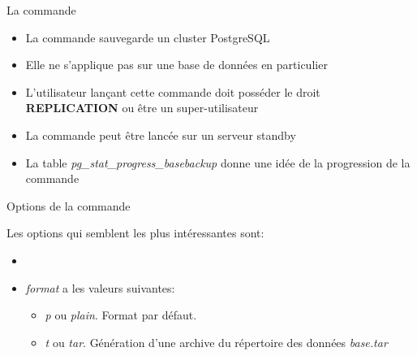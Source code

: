 \begin{frame}[fragile]{La commande }

\begin{itemize}

\item La commande  sauvegarde un cluster PostgreSQL
\item Elle ne s'applique pas sur une base de données en particulier
\item L'utilisateur lançant cette commande doit posséder le droit \textbf{REPLICATION} ou être un super-utilisateur
\item La commande peut être lancée sur un serveur standby
\item La table \textit{pg\_stat\_progress\_basebackup} donne une idée de la progression de la commande

\end{itemize}

\begin{toile}
\end{toile}

\end{frame}


\begin{frame}{Options de la commande }

   Les options qui semblent les plus intéressantes sont:

\begin{itemize}

   \item {}
   \item \textit{format} a les valeurs suivantes:
   \begin{itemize}
      \item  \textit{p} ou \textit{plain}. Format par défaut. 
      \item  \textit{t} ou \textit{tar}. Génération d'une archive du répertoire des données \textit{base.tar}
   \end{itemize}

\end{itemize}

\begin{toile}
\end{toile}

\end{frame}

